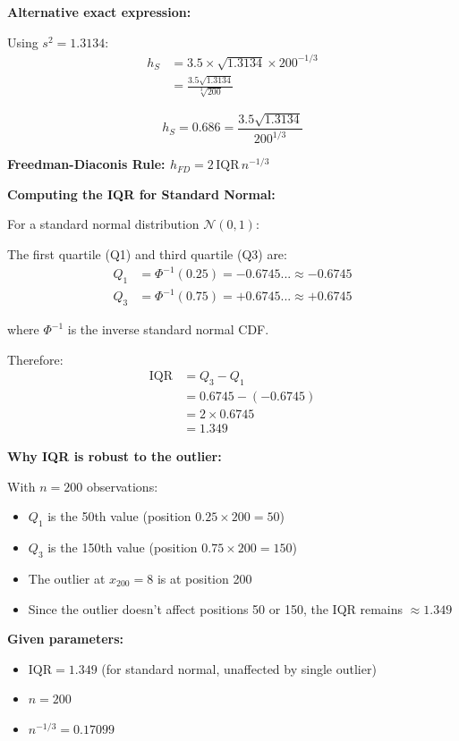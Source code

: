 \documentclass[12pt]{article}
\begin{document}
\begin{solution}
\textbf{Alternative exact expression:}

Using \(s^2 = 1.3134\):
\begin{align*}
h_S &= 3.5 \times \sqrt{1.3134} \times 200^{-1/3} \\
&= \frac{3.5\sqrt{1.3134}}{\sqrt[3]{200}}
\end{align*}

\[
\boxed{h_S = 0.686 = \frac{3.5\sqrt{1.3134}}{200^{1/3}}}
\]

\textbf{Freedman-Diaconis Rule: \(h_{FD} = 2\,\mathrm{IQR}\,n^{-1/3}\)}

\textbf{Computing the IQR for Standard Normal:}

For a standard normal distribution \(\mathcal{N}(0,1)\):

The first quartile (Q1) and third quartile (Q3) are:
\begin{align*}
Q_1 &= \Phi^{-1}(0.25) = -0.6745... \approx -0.6745 \\
Q_3 &= \Phi^{-1}(0.75) = +0.6745... \approx +0.6745
\end{align*}

where \(\Phi^{-1}\) is the inverse standard normal CDF.

Therefore:
\begin{align*}
\mathrm{IQR} &= Q_3 - Q_1 \\
&= 0.6745 - (-0.6745) \\
&= 2 \times 0.6745 \\
&= 1.349
\end{align*}

\textbf{Why IQR is robust to the outlier:}

With \(n = 200\) observations:
\begin{itemize}
    \item \(Q_1\) is the 50th value (position \(0.25 \times 200 = 50\))
    \item \(Q_3\) is the 150th value (position \(0.75 \times 200 = 150\))
    \item The outlier at \(x_{200} = 8\) is at position 200
    \item Since the outlier doesn't affect positions 50 or 150, the IQR remains \(\approx 1.349\)
\end{itemize}

\textbf{Given parameters:}
\begin{itemize}
    \item \(\mathrm{IQR} = 1.349\) (for standard normal, unaffected by single outlier)
    \item \(n = 200\)
    \item \(n^{-1/3} = 0.17099\)
\end{itemize}


\end{solution}
\end{document}
